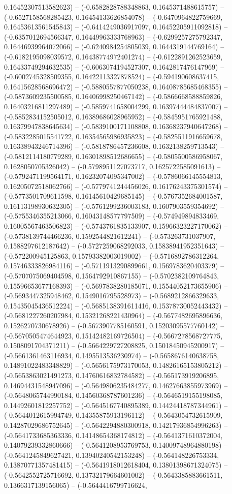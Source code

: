 0.16452307513582623) -- (-0.6582828788348863, 0.1645371488615757) -- (-0.6527158568285423, 0.16454133626854078) -- (-0.6470964822759669, 0.16453613561545843) -- (-0.6414249036917097, 0.16452205911092818) -- (-0.6357012694566347, 0.16449963333768963) -- (-0.6299257275792347, 0.16446939964072066) -- (-0.6240984254805039, 0.1644319144769164) -- (-0.6182195098039572, 0.16438774972401274) -- (-0.6122891262523659, 0.16433749294632535) -- (-0.6063074194527307, 0.1642817476147969) -- (-0.6002745328509355, 0.16422113327878524) -- (-0.594190608637415, 0.16415628568696472) -- (-0.5880557877050238, 0.16408785685468355) -- (-0.5873609235500585, 0.16406998250467142) -- (-0.5866668588859826, 0.16403216811297489) -- (-0.5859741658004299, 0.16397444484837007) -- (-0.5852834152505012, 0.16389686028965952) -- (-0.5845951765921488, 0.16379947838645634) -- (-0.5839100171108808, 0.16368237940647268) -- (-0.5832285015541722, 0.16354565986935823) -- (-0.5825511916659678, 0.16338943246714396) -- (-0.5818786457236608, 0.1632138259713543) -- (-0.5812114180779289, 0.16301898512686655) -- (-0.5805500586958067, 0.1628050705326042) -- (-0.5798951127073717, 0.1625722585091613) -- (-0.5792471199564171, 0.16232074095347002) -- (-0.5786066145554813, 0.16205072518062766) -- (-0.5779741244456026, 0.16176243375301574) -- (-0.5773501709611598, 0.16145610429685145) -- (-0.5767352684001587, 0.16113198930632305) -- (-0.5761299236003183, 0.1607903559354692) -- (-0.5755346355213066, 0.16043148577797509) -- (-0.574949894833469, 0.16005567463506823) -- (-0.5743761835133907, 0.15966323227170062) -- (-0.5738139744466236, 0.1592544821612241) -- (-0.573263731037907, 0.1588297612187642) -- (-0.5727259068292033, 0.15838941952351643) -- (-0.572200945125863, 0.15793382003019002) -- (-0.5716892786312264, 0.15746333826984116) -- (-0.5711913290899661, 0.1569783620403379) -- (-0.5707075069404598, 0.1564792910867155) -- (-0.5702382109764843, 0.15596653677168393) -- (-0.5697838280185071, 0.15544052173655906) -- (-0.5693447325948462, 0.1549016795528973) -- (-0.5689212866329633, 0.15435045436512224) -- (-0.5685138391611416, 0.15378730052443432) -- (-0.5681227260207984, 0.15321268221430964) -- (-0.5677482695896636, 0.1526270730678926) -- (-0.5673907785160591, 0.15203095577760142) -- (-0.5670505474644923, 0.15142482169726504) -- (-0.5667278568727775, 0.1508091704371211) -- (-0.5664229727208825, 0.15018450945200917) -- (-0.5661361463116934, 0.1495513536230974) -- (-0.5658676140638758, 0.14891022483348829) -- (-0.5656175973170053, 0.14826165153805212) -- (-0.5653863021491273, 0.14760616832784582) -- (-0.565173919206895, 0.14694431548947096) -- (-0.5649806235484277, 0.14627663855973969) -- (-0.5648065744990184, 0.14560368787601236) -- (-0.5646519155198085, 0.14492601812257752) -- (-0.5645167740895389, 0.14424418787344961) -- (-0.5644012615994749, 0.14355875913196112) -- (-0.5643054732615909, 0.14287029686752645) -- (-0.5642294880300918, 0.14217936854996263) -- (-0.5641733685363336, 0.14148654368174812) -- (-0.5641371610372004, 0.14079239332860666) -- (-0.5641208953769753, 0.14009748964880198) -- (-0.5641245849627421, 0.13940240542153248) -- (-0.564148226753334, 0.13870771357481415) -- (-0.5641918012618404, 0.13801398671324075) -- (-0.5642552725716692, 0.13732179664601002) -- (-0.5643385883661511, 0.1366317139156065) -- (-0.5644416799716624, 